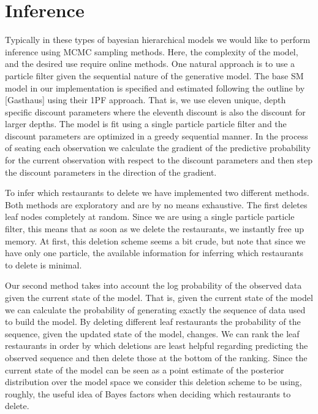 \section{Inference}

Typically in these types of bayesian hierarchical models we would like to perform inference using MCMC sampling methods.  Here, the complexity of the model, and the desired use require online methods.  One natural approach is to use a particle filter given the sequential nature of the generative model.  The base SM model in our implementation is specified and estimated following the outline by [Gasthaus] using their 1PF approach.  That is, we use eleven unique, depth specific discount parameters where the eleventh discount is also the discount for larger depths.  The model is fit using a single particle particle filter and the discount parameters are optimized in a greedy sequential manner.  In the process of seating each observation we calculate the gradient of the predictive probability for the current observation with respect to the discount parameters and then step the discount parameters in the direction of the gradient.

To infer which restaurants to delete we have implemented two different methods.  Both methods are exploratory and are by no means exhaustive.  The first deletes leaf nodes completely at random.  Since we are using a single particle particle filter, this means that as soon as we delete the restaurants, we instantly free up memory.  At first, this deletion scheme seems a bit crude, but note that since we have only one particle, the available information for inferring which restaurants to delete is minimal.  

Our second method takes into account the log probability of the observed data given the current state of the model.  That is, given the current state of the model we can calculate the probability of generating exactly the sequence of data used to build the model.  By deleting different leaf restaurants the probability of the sequence, given the updated state of the model, changes.  We can rank the leaf restaurants in order by which deletions are least helpful regarding predicting the observed sequence and then delete those at the bottom of the ranking.  Since the current state of the model can be seen as a point estimate of the posterior distribution over the model space we consider this deletion scheme to be using, roughly, the useful idea of Bayes factors when deciding which restaurants to delete.

